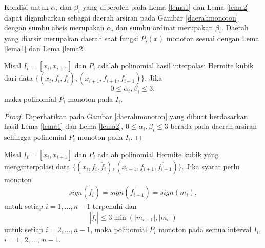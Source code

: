 Kondisi untuk $\alpha_i$ dan $\beta_i$ yang diperoleh pada Lema \ref{lema1} dan Lema \ref{lema2} dapat digambarkan sebagai daerah arsiran pada Gambar \ref{daerahmonoton} dengan sumbu absis merupakan $\alpha_i$ dan sumbu ordinat merupakan $\beta_i$. Daerah yang diarsir merupakan daerah saat fungsi $P_i(x)$ monoton sesuai dengan Lema \ref{lema1} dan Lema \ref{lema2}.

\begin{teorema}\label{ab_leq3}
    Misal $I_i = [x_i,x_{i+1}]$ dan $P_i$ adalah polinomial hasil interpolasi Hermite kubik dari data $\{(x_i,f_i,\dot{f_i}),(x_{i+1},f_{i+1},\dot{f_{i+1}})\}$.
    Jika
    \begin{equation*}
        0 \leq \alpha_i, \beta_i \leq 3,
    \end{equation*}
    maka polinomial $P_i$ monoton pada $I_i$.
\end{teorema}

\begin{proof}
    Diperhatikan pada Gambar \ref{daerahmonoton} yang dibuat berdasarkan hasil Lema \ref{lema1} dan Lema \ref{lema2}, $0 \leq \alpha_i, \beta_i \leq 3$ berada pada daerah arsiran sehingga polinomial $P_i$ monoton pada $I_i$.
\end{proof}

\begin{teorema}\label{3.1.7}
    Misal $I_i = [x_i,x_{i+1}]$ dan $P_i$ adalah polinomial Hermite kubik yang menginterpolasi data $\{(x_i,f_i,\dot{f_i}),(x_{i+1},f_{i+1},\dot{f_{i+1}})\}$.
    Jika syarat perlu monoton
    \begin{align*}
     sign(\dot{f_i})=sign(\dot{f_{i+1}})=sign(m_i),
    \end{align*}
    untuk setiap $i=1,\dots,n-1$ terpenuhi dan
    \begin{equation*}
        |\dot{f_i}| \leq 3 \min(|m_{i-1}|,|m_i|)
    \end{equation*}
    untuk setiap $i=2,\dots,n-1$, maka polinomial $P_i$ monoton pada semua interval $I_i$, $i=1,\:2,\dots,\:n-1$.
\end{teorema}

